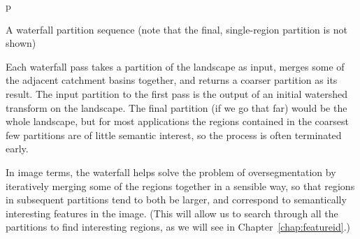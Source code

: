 \begin{stusubfig}{p}
	\hspace{4mm}%
	\hspace{4mm}%
\caption{A waterfall partition sequence (note that the final, single-region partition is not shown)}
\label{fig:segmentation-waterfall-partitionsequence}
\end{stusubfig}

Each waterfall pass takes a partition of the landscape as input, merges some of the adjacent catchment basins together, and returns a coarser partition as its result. The input partition to the first pass is the output of an initial watershed transform on the landscape. The final partition (if we go that far) would be the whole landscape, but for most applications the regions contained in the coarsest few partitions are of little semantic interest, so the process is often terminated early.

In image terms, the waterfall helps solve the problem of oversegmentation by iteratively merging some of the regions together in a sensible way, so that regions in subsequent partitions tend to both be larger, and correspond to semantically interesting features in the image. (This will allow us to search through all the partitions to find interesting regions, as we will see in Chapter~\ref{chap:featureid}.)

